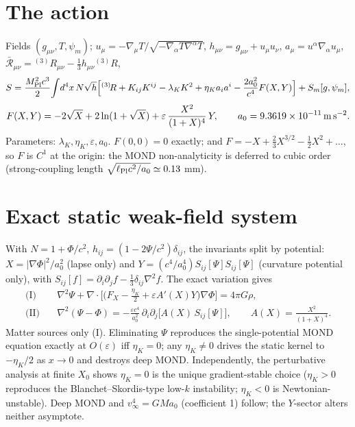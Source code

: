 \documentclass[11pt]{article}
\begin{document}
\section{The action}
Fields $(g_{\mu\nu},T,\psi_m)$;
$u_\mu=-\nabla_\mu T/\sqrt{-\nabla_\alpha T\nabla^\alpha T}$,
$h_{\mu\nu}=g_{\mu\nu}+u_\mu u_\nu$, $a_\mu=u^\alpha\nabla_\alpha u_\mu$,
$\bar{\mathcal R}_{\mu\nu}={}^{(3)}\!R_{\mu\nu}-\tfrac13h_{\mu\nu}{}^{(3)}\!R$,
\begin{equation}
S=\frac{M_{\rm Pl}^2c^3}{2}\!\int\! d^4x\,N\sqrt h\Big[{}^{(3)}\!R+K_{ij}K^{ij}
-\lambda_K K^2+\eta_K a_ia^i-\frac{2a_0^2}{c^4}F(X,Y)\Big]+S_m[g,\psi_m],
\end{equation}
\begin{equation}
F(X,Y)=-2\sqrt X+2\ln(1+\sqrt X)+\varepsilon\,\frac{X^2}{(1+X)^4}\,Y,
\qquad a_0=9.3619\times10^{-11}\,{\rm m\,s^{-2}}.
\end{equation}
Parameters: $\lambda_K,\eta_K,\varepsilon,a_0$. $F(0,0)=0$ exactly; and
$F=-X+\tfrac23X^{3/2}-\tfrac12X^2+\dots$, so $F$ is $C^1$ at the origin: the MOND
non-analyticity is deferred to cubic order (strong-coupling length
$\sqrt{\ell_{\rm Pl}c^2/a_0}\simeq0.13$ mm).

\section{Exact static weak-field system}
With $N=1+\Phi/c^2$, $h_{ij}=(1-2\Psi/c^2)\delta_{ij}$, the invariants split by
potential: $X=|\nabla\Phi|^2/a_0^2$ (lapse only) and
$Y=(c^4/a_0^4)S_{ij}[\Psi]S_{ij}[\Psi]$ (curvature potential only), with
$S_{ij}[f]=\partial_i\partial_jf-\tfrac13\delta_{ij}\nabla^2f$.  The exact variation gives
\begin{align}
\text{(I)}\quad &\nabla^2\Psi+\nabla\!\cdot\!\Big[\big(F_X-\tfrac{\eta_K}{2}
+\varepsilon A'(X)Y\big)\nabla\Phi\Big]=4\pi G\rho,\\
\text{(II)}\quad &\nabla^2(\Psi-\Phi)=-\frac{\varepsilon c^4}{a_0^2}\,
\partial_i\partial_j\big[A(X)\,S_{ij}[\Psi]\big],\qquad A(X)=\frac{X^2}{(1+X)^4}.
\end{align}
Matter sources only (I).  Eliminating $\Psi$ reproduces the single-potential MOND
equation exactly at $O(\varepsilon)$ iff $\eta_K=0$; any $\eta_K\neq0$ drives the
static kernel to $-\eta_K/2$ as $x\to0$ and destroys deep MOND.  Independently, the
perturbative analysis at finite $X_0$ shows $\eta_K=0$ is the unique gradient-stable
choice ($\eta_K>0$ reproduces the Blanchet--Skordis-type low-$k$ instability;
$\eta_K<0$ is Newtonian-unstable).  Deep MOND and $v_\infty^4=GMa_0$ (coefficient 1)
follow; the $Y$-sector alters neither asymptote.
\end{document}
